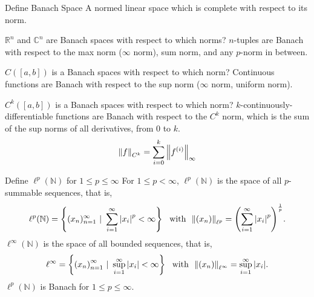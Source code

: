 \documentclass[avery5388,grid,frame]{flashcards}
\def\Rl{\mathbb{R}}
\def\Cx{\mathbb{C}}
\begin{document}


\begin{flashcard}
    {Define Banach Space}
    A normed linear space which is complete with respect to its norm.
\end{flashcard}

\begin{flashcard}
    {$\Rl^n$ and $\Cx^n$ are Banach spaces with respect to which norms?}
    $n$-tuples are Banach with respect to the max norm ($\infty$ norm), sum norm, and any $p$-norm in between.
\end{flashcard}

\begin{flashcard}
    {$C([a,b])$ is a Banach spaces with respect to which norm?}
    Continuous functions are Banach with respect to the sup norm ($\infty$ norm, uniform norm).
\end{flashcard}

\begin{flashcard}
    {$C^k([a,b])$ is a Banach spaces with respect to which norm?}
    $k$-continuously-differentiable functions are Banach with respect to the $C^k$ norm, which is the sum of the sup norms of all derivatives, from $0$ to $k$.
    \begin{equation*}
        \norm{f}_{C^k} = \sum_{i=0}^k \norm{f^{(i)}}_\infty
    \end{equation*}
\end{flashcard}

\begin{flashcard}
    {Define $\ell^p(\mathbb{N})$ for $1 \leq p \leq \infty$}
    For $1 \leq p < \infty$, $\ell^p(\mathbb{N})$ is the space of all $p$-summable sequences, that is,
    \begin{align*}
        \ell^p(\mathbb{N}) = \left\{(x_n)_{n=1}^\infty\ |\ \sum_{i=1}^\infty\abs{x_i}^p < \infty\right\} \ \ \text{with} \ \ \norm{(x_n)}_{\ell^p} = \qty(\sum_{i=1}^\infty \abs{x_i}^p)^{\frac{1}{p}}.
    \end{align*}
    $\ell^\infty(\mathbb{N})$ is the space of all bounded sequences, that is,
    \begin{align*}
        \ell^\infty = \left\{\qty(x_n)_{n=1}^\infty\ |\ \sup_{i=1}^\infty\abs{x_i} < \infty\right\} \ \ \text{with} \ \ \norm{(x_n)}_{\ell^\infty} = \sup_{i=1}^\infty\abs{x_i}.
    \end{align*}
    $\ell^p(\mathbb{N})$ is Banach for $1 \leq p \leq \infty$.
\end{flashcard}
\end{document}
